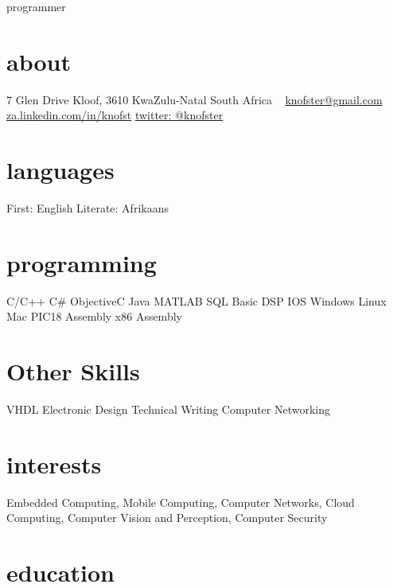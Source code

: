\documentclass[]{friggeri-cv}
\begin{document}
       {programmer}


\begin{aside}
  \section{about}
    7 Glen Drive
    Kloof, 3610
    KwaZulu-Natal
    South Africa 
    ~
    \href{mailto:knofster@gmail.com}{knofster@gmail.com}
    \href{http://za.linkedin.com/in/knofst}{za.linkedin.com/in/knofst}
    \href{https://twitter.com/knofster}{twitter: @knofster}
  \section{languages}
    First: English
    Literate: Afrikaans
  \section{programming}
    C/C++
    C\#
    ObjectiveC
    Java
    MATLAB
    SQL
   	Basic DSP
   	IOS
   	Windows
   	Linux
   	Mac
   	PIC18 Assembly
   	x86 Assembly
  \section{Other Skills}
  	VHDL
  	Electronic Design
  	Technical Writing
  	Computer Networking
    
\end{aside}

\section{interests}

Embedded Computing, Mobile Computing, Computer Networks, Cloud Computing, Computer Vision and Perception, Computer Security 

\section{education}
\end{document}
